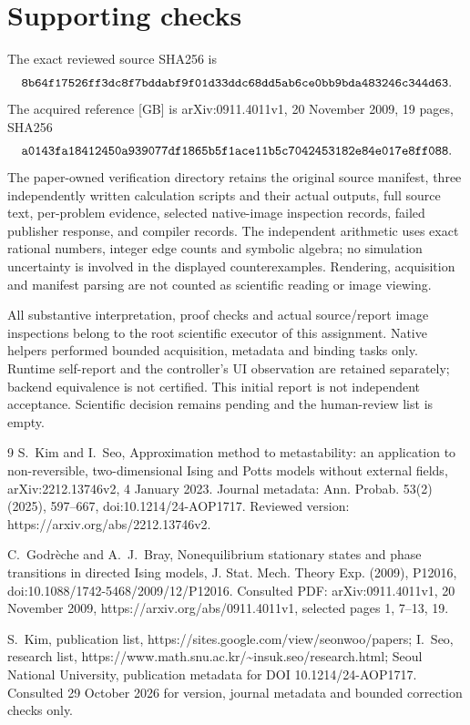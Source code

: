 \documentclass[10pt]{article}
\begin{document}
\section*{Supporting checks}
The exact reviewed source SHA256 is \[\text{\texttt{8b64f17526ff3dc8f7bddabf9f01d33ddc68dd5ab6ce0bb9bda483246c344d63}}.\] The acquired reference [GB] is arXiv:0911.4011v1, 20 November 2009, 19 pages, SHA256 \[\text{\texttt{a0143fa18412450a939077df1865b5f1ace11b5c7042453182e84e017e8ff088}}.\] The paper-owned verification directory retains the original source manifest, three independently written calculation scripts and their actual outputs, full source text, per-problem evidence, selected native-image inspection records, failed publisher response, and compiler records. The independent arithmetic uses exact rational numbers, integer edge counts and symbolic algebra; no simulation uncertainty is involved in the displayed counterexamples. Rendering, acquisition and manifest parsing are not counted as scientific reading or image viewing.\par
All substantive interpretation, proof checks and actual source/report image inspections belong to the root scientific executor of this assignment. Native helpers performed bounded acquisition, metadata and binding tasks only. Runtime self-report and the controller’s UI observation are retained separately; backend equivalence is not certified. This initial report is not independent acceptance. Scientific decision remains pending and the human-review list is empty.\par
9 S. Kim and I. Seo, Approximation method to metastability: an application to non-reversible, two-dimensional Ising and Potts models without external fields, arXiv:2212.13746v2, 4 January 2023. Journal metadata: Ann. Probab. 53(2) (2025), 597–667, doi:10.1214/24-AOP1717. Reviewed version: https://arxiv.org/abs/2212.13746v2.\par
C. Godrèche and A. J. Bray, Nonequilibrium stationary states and phase transitions in directed Ising models, J. Stat. Mech. Theory Exp. (2009), P12016, doi:10.1088/1742-5468/2009/12/P12016. Consulted PDF: arXiv:0911.4011v1, 20 November 2009, https://arxiv.org/abs/0911.4011v1, selected pages 1, 7–13, 19.\par
S. Kim, publication list, https://sites.google.com/view/seonwoo/papers; I. Seo, research list, https://www.math.snu.ac.kr/\textasciitilde{}insuk.seo/research.html; Seoul National University, publication metadata for DOI 10.1214/24-AOP1717. Consulted 29 October 2026 for version, journal metadata and bounded correction checks only.\par
\end{document}
